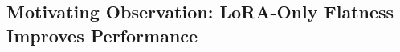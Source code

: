 \documentclass{article} %
\begin{document}


\subsection{Motivating Observation: LoRA-Only Flatness Improves Performance}
\end{document}
